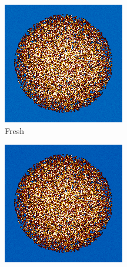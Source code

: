 \begin{figure}[h!]
\centering
%
\begin{subfigure}{0.25\textwidth}
  \includegraphics[width=0.95\linewidth]{figures/burn-20-bstep0}
  \caption{Fresh}
  \label{fig:bstep0}
\end{subfigure}%
%
\begin{subfigure}{0.25\textwidth}
  \includegraphics[width=0.95\linewidth]{figures/burn-20-bstep1}

\end{subfigure}
\end{figure}
